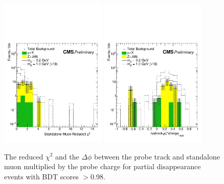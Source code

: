 \begin{figure}[htbp]
	\centering
	\includegraphics[width=0.45\textwidth]{figures/partDisappStaChi.pdf}
	\hspace{0.01\textwidth}
	\includegraphics[width=0.45\textwidth]{figures/partDisappStaPhi.pdf}
	\caption[Expected Partial Disappearance Standalone Muon Quality]{The reduced $\chi^{2}$ and the $\Delta\phi$ between the probe track and standalone muon multiplied by the probe charge for partial disappearance events with BDT scores $>$0.98.}
	\label{fig:partStaFeat}
\end{figure}
